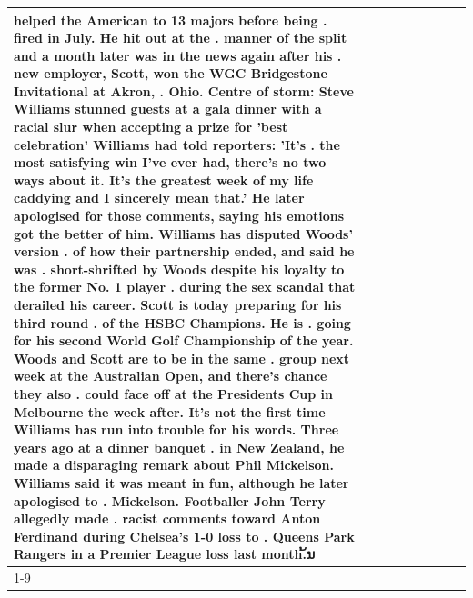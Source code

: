 \begin{table}[H]
\begin{tabular}{lllrlllll}
helped the American to 13 majors before being . fired in July. He hit out at the . manner of the split and a month later was in the news again after his . new employer, Scott, won the WGC Bridgestone Invitational at Akron, . Ohio. Centre of storm: Steve Williams stunned guests at a gala dinner with a racial slur when accepting a prize for 'best celebration' Williams had told reporters: 'It's . the most satisfying win I've ever had, there's no two ways about it. It's the greatest week of my life caddying and I sincerely mean that.' He later apologised for those comments, saying his emotions got the better of him. Williams has disputed Woods' version . of how their partnership ended, and said he was . short-shrifted by Woods despite his loyalty to the former No. 1 player . during the sex scandal that derailed his career. Scott is today preparing for his third round . of the HSBC Champions. He is . going for his second World Golf Championship of the year. Woods and Scott are to be in the same . group next week at the Australian Open, and there's chance they also . could face off at the Presidents Cup in Melbourne the week after. It's not the first time Williams has run into trouble for his words. Three years ago at a dinner banquet . in New Zealand, he made a disparaging remark about Phil Mickelson. Williams said it was meant in fun, although he later apologised to . Mickelson. Footballer John Terry allegedly made . racist comments toward Anton Ferdinand during Chelsea's 1-0 loss to . Queens Park Rangers in a Premier League loss last month.້ນ \\
\cline{1-9}

\end{tabular}
\end{table}
